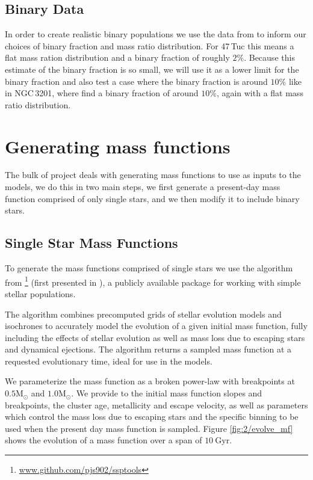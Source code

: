 \subsection{Binary Data}

In order to create realistic binary populations we use the data from \citet{Milone2012} to inform
our choices of binary fraction and mass ratio distribution. For 47\,Tuc this means a flat mass
ration distribution and a binary fraction of roughly $2\%$. Because this estimate of the binary
fraction is so small, we will use it as a lower limit for the binary fraction and also test a case
where the binary fraction is around $10\%$ like in NGC\,3201, where \citet{Milone2012} find a binary
fraction of around $10\%$, again with a flat mass ratio distribution.





\section{Generating mass functions}

The bulk of project deals with generating mass functions to use as inputs to the 
models, we do this in two main steps, we first generate a present-day mass function comprised of
only single stars, and we then modify it to include binary stars.

\subsection{Single Star Mass Functions}


To generate the mass functions comprised of single stars we use the \evolvemf{} algorithm from
\footnote{\url{www.github.com/pjs902/ssptools}} (first presented in
\citealt{Balbinot2018}), a publicly available package for working with simple stellar populations.

The \evolvemf{} algorithm combines precomputed grids of stellar evolution models and isochrones to
accurately model the evolution of a given initial mass function, fully including the effects of
stellar evolution as well as mass loss due to escaping stars and dynamical ejections. The algorithm
returns a sampled mass function at a requested evolutionary time, ideal for use in the 
models.

We parameterize the mass function as a broken power-law with breakpoints at $0.5 \mathrm{M}_\odot$
and $1.0 \mathrm{M}_\odot$. We provide to \evolvemf{} the initial mass function slopes and
breakpoints, the cluster age, metallicity and escape velocity, as well as parameters which control
the mass loss due to escaping stars and the specific binning to be used when the present day mass
function is sampled. Figure \ref{fig:2/evolve_mf} shows the evolution of a mass function over a span
of $10 \ \mathrm{Gyr}$.

